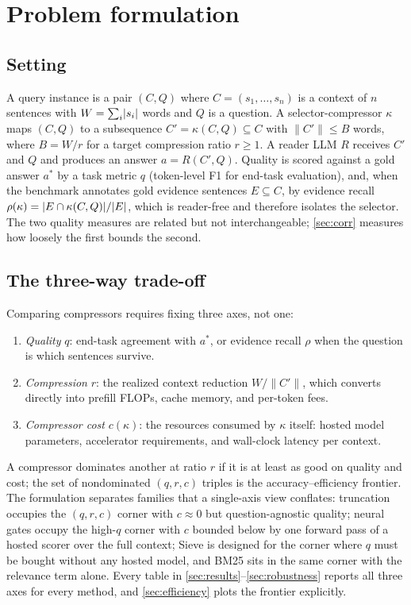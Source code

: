 \documentclass[pdflatex,sn-basic]{sn-jnl}
\DeclarePairedDelimiter\abs{\lvert}{\rvert}
\theoremstyle{remark}
\newcommand{\method}{Sieve}
\begin{document}
\section{Problem formulation}
\label{sec:formulation}

\subsection{Setting}
A query instance is a pair $(C, Q)$ where $C = (s_1, \ldots, s_n)$ is
a context of $n$ sentences with $W = \sum_i \abs{s_i}$ words and $Q$
is a question. A selector-compressor $\kappa$ maps $(C, Q)$ to a
subsequence $C' = \kappa(C, Q) \subseteq C$ with
$\lVert C' \rVert \le B$ words, where $B = W / r$ for a target
compression ratio $r \ge 1$. A reader LLM $R$ receives $C'$ and $Q$
and produces an answer $a = R(C', Q)$. Quality is scored against a
gold answer $a^{*}$ by a task metric $q$ (token-level F1 for end-task
evaluation), and, when the benchmark annotates gold evidence sentences
$E \subseteq C$, by evidence recall
$\rho(\kappa) = \abs{E \cap \kappa(C, Q)} / \abs{E}$, which is
reader-free and therefore isolates the selector. The two quality
measures are related but not interchangeable; \autoref{sec:corr}
measures how loosely the first bounds the second.

\subsection{The three-way trade-off}
\label{sec:tradeoff}
Comparing compressors requires fixing three axes, not one:
\begin{enumerate}[label=(\roman*)]
\item \emph{Quality} $q$: end-task agreement with $a^{*}$, or evidence
recall $\rho$ when the question is which sentences survive.
\item \emph{Compression} $r$: the realized context reduction
$W / \lVert C' \rVert$, which converts directly into prefill FLOPs,
cache memory, and per-token fees.
\item \emph{Compressor cost} $c(\kappa)$: the resources consumed by
$\kappa$ itself: hosted model parameters, accelerator requirements,
and wall-clock latency per context.
\end{enumerate}
A compressor dominates another at ratio $r$ if it is at least as good
on quality and cost; the set of nondominated $(q, r, c)$ triples is
the accuracy--efficiency frontier. The formulation separates families
that a single-axis view conflates: truncation occupies the $(q, r, c)$
corner with $c \approx 0$ but question-agnostic quality; neural gates
occupy the high-$q$ corner with $c$ bounded below by one forward pass
of a hosted scorer over the full context; \method{} is designed for
the corner where $q$ must be bought without any hosted model, and BM25
sits in the same corner with the relevance term alone. Every table in
\autoref{sec:results}--\autoref{sec:robustness} reports all three axes
for every method, and \autoref{sec:efficiency} plots the frontier
explicitly.
\end{document}
